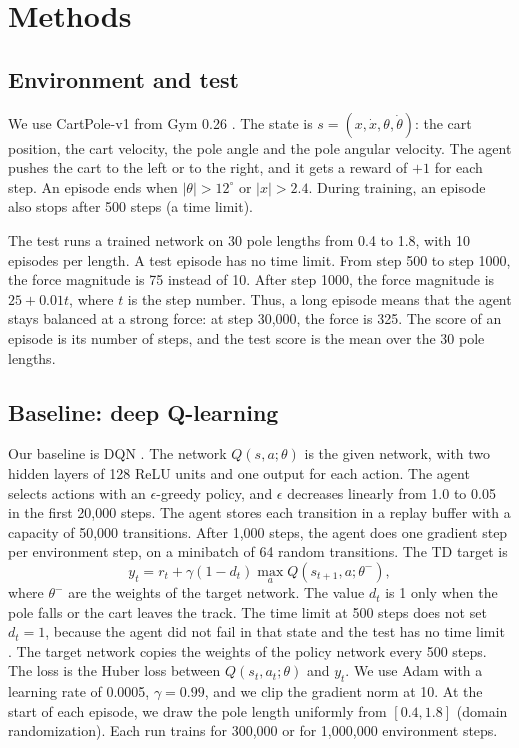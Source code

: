 \documentclass[sigconf]{acmart}
\begin{document}
\section{Methods}

\subsection{Environment and test}
We use CartPole-v1 from Gym 0.26 \cite{brockman2016openai}. The state is $s = (x, \dot{x}, \theta, \dot{\theta})$: the cart position, the cart velocity, the pole angle and the pole angular velocity. The agent pushes the cart to the left or to the right, and it gets a reward of $+1$ for each step. An episode ends when $|\theta| > 12^{\circ}$ or $|x| > 2.4$. During training, an episode also stops after 500 steps (a time limit).

The test runs a trained network on 30 pole lengths from 0.4 to 1.8, with 10 episodes per length. A test episode has no time limit. From step 500 to step 1000, the force magnitude is 75 instead of 10. After step 1000, the force magnitude is $25 + 0.01t$, where $t$ is the step number. Thus, a long episode means that the agent stays balanced at a strong force: at step 30{,}000, the force is 325. The score of an episode is its number of steps, and the test score is the mean over the 30 pole lengths.

\subsection{Baseline: deep Q-learning}
Our baseline is DQN \cite{mnih2015human}. The network $Q(s,a;\theta)$ is the given network, with two hidden layers of 128 ReLU units and one output for each action. The agent selects actions with an $\epsilon$-greedy policy, and $\epsilon$ decreases linearly from 1.0 to 0.05 in the first 20{,}000 steps. The agent stores each transition in a replay buffer with a capacity of 50{,}000 transitions. After 1{,}000 steps, the agent does one gradient step per environment step, on a minibatch of 64 random transitions. The TD target is
\begin{equation}
y_t = r_t + \gamma (1 - d_t) \max_{a} Q(s_{t+1}, a; \theta^{-}),
\end{equation}
where $\theta^{-}$ are the weights of the target network. The value $d_t$ is 1 only when the pole falls or the cart leaves the track. The time limit at 500 steps does not set $d_t = 1$, because the agent did not fail in that state and the test has no time limit \cite{pardo2018time}. The target network copies the weights of the policy network every 500 steps. The loss is the Huber loss between $Q(s_t,a_t;\theta)$ and $y_t$. We use Adam with a learning rate of 0.0005, $\gamma = 0.99$, and we clip the gradient norm at 10. At the start of each episode, we draw the pole length uniformly from $[0.4, 1.8]$ (domain randomization). Each run trains for 300{,}000 or for 1{,}000{,}000 environment steps.
\end{document}
